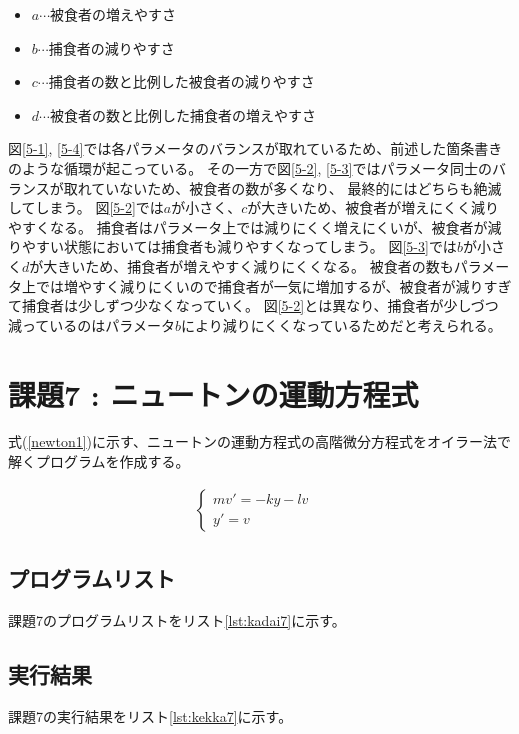 \begin{itemize}
  \item $a$$\cdots$被食者の増えやすさ
  \item $b$$\cdots$捕食者の減りやすさ
  \item $c$$\cdots$捕食者の数と比例した被食者の減りやすさ
  \item $d$$\cdots$被食者の数と比例した捕食者の増えやすさ
\end{itemize}

図\ref{5-1}, \ref{5-4}では各パラメータのバランスが取れているため、前述した箇条書きのような循環が起こっている。
その一方で図\ref{5-2}, \ref{5-3}ではパラメータ同士のバランスが取れていないため、被食者の数が多くなり、
最終的にはどちらも絶滅してしまう。
図\ref{5-2}では$a$が小さく、$c$が大きいため、被食者が増えにくく減りやすくなる。
捕食者はパラメータ上では減りにくく増えにくいが、被食者が減りやすい状態においては捕食者も減りやすくなってしまう。
図\ref{5-3}では$b$が小さく$d$が大きいため、捕食者が増えやすく減りにくくなる。
被食者の数もパラメータ上では増やすく減りにくいので捕食者が一気に増加するが、被食者が減りすぎて捕食者は少しずつ少なくなっていく。
図\ref{5-2}とは異なり、捕食者が少しづつ減っているのはパラメータ$b$により減りにくくなっているためだと考えられる。


\section{課題7 : ニュートンの運動方程式}
式(\ref{newton1})に示す、ニュートンの運動方程式の高階微分方程式をオイラー法で解くプログラムを作成する。

\begin{eqnarray}
  \begin{cases}
mv'=-ky-lv&\\
y'= v&
 \label{newton1}
  \end{cases}\label{newton1}
\end{eqnarray}

\subsection{プログラムリスト}
課題7のプログラムリストをリスト\ref{lst:kadai7}に示す。



\subsection{実行結果}
課題7の実行結果をリスト\ref{lst:kekka7}に示す。

